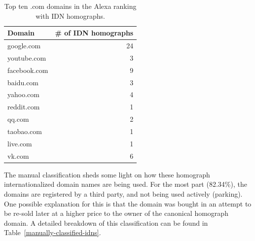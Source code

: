 \documentclass[letterpaper,twocolumn,10pt]{article}
\begin{document}
\begin{table}[ht!]
\centering
\begin{tabular}{lr}
\hline
Domain       & \# of IDN homographs \\ \hline
google.com   & 24                   \\
youtube.com  & 3                    \\
facebook.com & 9                    \\
baidu.com    & 3                    \\
yahoo.com    & 4                    \\
reddit.com   & 1                    \\
qq.com       & 2                    \\
taobao.com   & 1                    \\
live.com     & 1                    \\
vk.com       & 6                    \\ \hline
\end{tabular}
\caption{Top ten .com domains in the Alexa ranking with IDN homographs.}
\label{top-com-alexa-with-idns}
\end{table}

The manual classification sheds some light on how these homograph internationalized domain names are being used.
For the most part (82.34\%), the domains are registered by a third party, and not being used actively (parking).
One possible explanation for this is that the domain was bought in an attempt to be re-sold later at a higher price to the owner of the canonical homograph domain.
A detailed breakdown of this classification can be found in Table~\ref{manually-classified-idns}.
\end{document}
